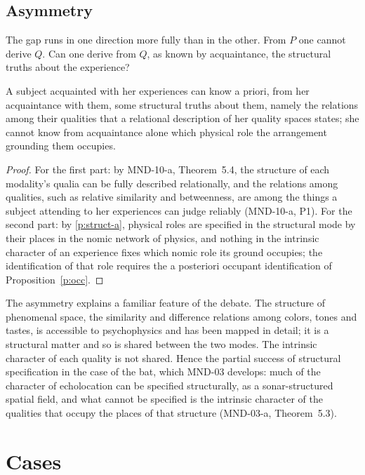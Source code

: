 \documentclass{situationist-preprint}
\begin{document}
\subsection{Asymmetry}

The gap runs in one direction more fully than in the other. From $P$ one cannot derive $Q$. Can one derive from $Q$, as known by acquaintance, the structural truths about the experience?

\begin{proposition}\label{p:asym}
A subject acquainted with her experiences can know a priori, from her acquaintance with them, some structural truths about them, namely the relations among their qualities that a relational description of her quality spaces states; she cannot know from acquaintance alone which physical role the arrangement grounding them occupies.
\end{proposition}

\begin{proof}
For the first part: by MND-10-a, Theorem~5.4, the structure of each modality's qualia can be fully described relationally, and the relations among qualities, such as relative similarity and betweenness, are among the things a subject attending to her experiences can judge reliably (MND-10-a, P1). For the second part: by \ref{p:struct-a}, physical roles are specified in the structural mode by their places in the nomic network of physics, and nothing in the intrinsic character of an experience fixes which nomic role its ground occupies; the identification of that role requires the a posteriori occupant identification of Proposition~\ref{p:occ}.
\end{proof}

The asymmetry explains a familiar feature of the debate. The structure of phenomenal space, the similarity and difference relations among colors, tones and tastes, is accessible to psychophysics and has been mapped in detail; it is a structural matter and so is shared between the two modes. The intrinsic character of each quality is not shared. Hence the partial success of structural specification in the case of the bat, which MND-03 develops: much of the character of echolocation can be specified structurally, as a sonar-structured spatial field, and what cannot be specified is the intrinsic character of the qualities that occupy the places of that structure (MND-03-a, Theorem~5.3).

\section{Cases}\label{s:cases}
\end{document}
